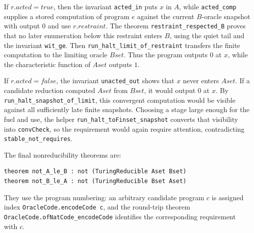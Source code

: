 If \(r.acted=true\), then the invariant \texttt{acted_in} puts \(x\) in
\(A\), while \texttt{acted_comp} supplies a stored computation of program
\(e\) against the current \(B\)-oracle snapshot with output \(0\) and use
\(r.restraint\).  The theorem \texttt{restraint_respected_B} proves that no
later enumeration below this restraint enters \(B\), using the quiet tail
and the invariant \texttt{wit_ge}.  Then
\texttt{run_halt_limit_of_restraint} transfers the finite computation to
the limiting oracle \(Bset\).  Thus the program outputs \(0\) at \(x\),
while the characteristic function of \(Aset\) outputs \(1\).

If \(r.acted=false\), the invariant \texttt{unacted_out} shows that \(x\)
never enters \(Aset\).  If a candidate reduction computed \(Aset\) from
\(Bset\), it would output \(0\) at \(x\).  By
\texttt{run_halt_snapshot_of_limit}, this convergent computation would be
visible against all sufficiently late finite snapshots.  Choosing a stage
large enough for the fuel and use, the helper
\texttt{run_halt_toFinset_snapshot} converts that visibility into
\texttt{convCheck}, so the requirement would again require attention,
contradicting \texttt{stable_not_requires}.

The final nonreducibility theorems are:

\begin{lstlisting}
theorem not_A_le_B : not (TuringReducible Aset Bset)
theorem not_B_le_A : not (TuringReducible Bset Aset)
\end{lstlisting}

They use the program numbering: an arbitrary candidate program \(c\) is
assigned index \texttt{OracleCode.encodeCode c}, and the round-trip theorem
\texttt{OracleCode.ofNatCode_encodeCode} identifies the corresponding
requirement with \(c\).

